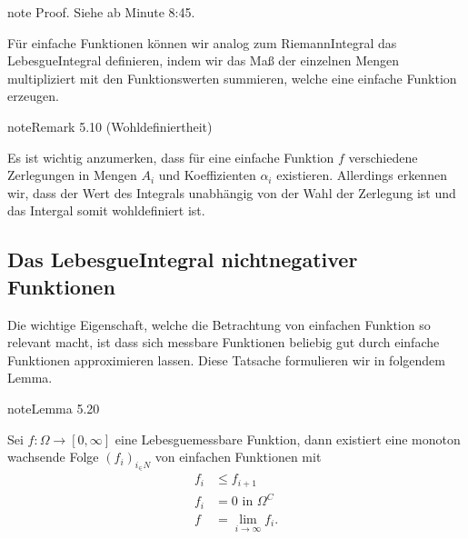 \documentclass[letterpaper,10pt,german]{jupyterBook}
\begin{document}
\begin{sphinxadmonition}{note}
\sphinxAtStartPar
Proof. Siehe  ab Minute 8:45.
\end{sphinxadmonition}

\sphinxAtStartPar
Für einfache Funktionen können wir analog zum Riemann\sphinxhyphen{}Integral das Lebesgue\sphinxhyphen{}Integral definieren, indem wir das Maß der einzelnen Mengen multipliziert mit den Funktionswerten summieren, welche eine einfache Funktion erzeugen.
\label{masstheorie/lebesgue_integral:remark-10}
\begin{sphinxadmonition}{note}{Remark 5.10 (Wohldefiniertheit)}



\sphinxAtStartPar
Es ist wichtig anzumerken, dass für eine einfache Funktion \(f\) verschiedene Zerlegungen in Mengen \(A_i\) und Koeffizienten \(\alpha_i\) existieren. Allerdings erkennen wir, dass der Wert des Integrals unabhängig von der Wahl der Zerlegung ist und das Intergal somit wohldefiniert ist.
\end{sphinxadmonition}


\subsection{Das Lebesgue\sphinxhyphen{}Integral nicht\sphinxhyphen{}negativer Funktionen}
\label{\detokenize{masstheorie/lebesgue_integral:das-lebesgue-integral-nicht-negativer-funktionen}}
\sphinxAtStartPar
Die wichtige Eigenschaft, welche die Betrachtung von einfachen Funktion so relevant macht, ist dass sich messbare Funktionen beliebig gut durch einfache Funktionen approximieren lassen. Diese Tatsache formulieren wir in folgendem Lemma.
\label{masstheorie/lebesgue_integral:lem:simplefun}
\begin{sphinxadmonition}{note}{Lemma 5.20}



\sphinxAtStartPar
Sei \(f \colon \Omega \to [0,\infty]\) eine Lebesgue\sphinxhyphen{}messbare Funktion, dann existiert eine monoton wachsende Folge \((f_i)_{i_\in N}\) von einfachen Funktionen mit
\begin{equation*}
\begin{split}f_i&\leq f_{i+1}\\
f_i &= 0\text{ in }\Omega^C\\
f&=\lim_{i\to\infty} f_i.\end{split}
\end{equation*}\end{sphinxadmonition}
\end{document}
